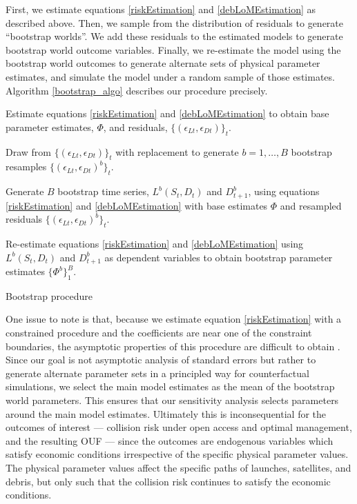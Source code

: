 \documentclass[9pt,twoside,lineno]{pnas-new}
\begin{document}
First, we estimate equations \ref{riskEstimation} and \ref{debLoMEstimation} as described above. Then, we sample from the distribution of residuals to generate ``bootstrap worlds''. We add these residuals to the estimated models to generate bootstrap world outcome variables. Finally, we re-estimate the model using the bootstrap world outcomes to generate alternate sets of physical parameter estimates, and simulate the model under a random sample of those estimates. Algorithm \ref{bootstrap_algo} describes our procedure precisely.\\
\begin{algorithm}
	Estimate equations \ref{riskEstimation} and \ref{debLoMEstimation} to obtain base parameter estimates, $\Phi$, and residuals, $\{(\epsilon_{Lt},\epsilon_{Dt})\}_t$.
	
	Draw from $\{(\epsilon_{Lt},\epsilon_{Dt})\}_t$ with replacement to generate $b=1,\dots,B$ bootstrap resamples $\{(\epsilon_{Lt},\epsilon_{Dt})^b\}_t$.
	
	Generate $B$ bootstrap time series, $L^b(S_t,D_t)$ and $D_{t+1}^b$, using equations \ref{riskEstimation} and \ref{debLoMEstimation} with base estimates $\Phi$ and resampled residuals $\{ (\epsilon_{Lt},\epsilon_{Dt})^b \}_t$.
	
	Re-estimate equations \ref{riskEstimation} and \ref{debLoMEstimation} using $L^b(S_t,D_t)$ and $D_{t+1}^b$ as dependent variables to obtain bootstrap parameter estimates $\{\Phi^b\}_1^B$.
	\caption{Bootstrap procedure}\label{bootstrap_algo}
\end{algorithm}

One issue to note is that, because we estimate equation \ref{riskEstimation} with a constrained procedure and the coefficients are near one of the constraint boundaries, the asymptotic properties of this procedure are difficult to obtain \cite{ketz2018}. Since our goal is not asymptotic analysis of standard errors but rather to generate alternate parameter sets in a principled way for counterfactual simulations, we select the main model estimates as the mean of the bootstrap world parameters. This ensures that our sensitivity analysis selects parameters around the main model estimates. Ultimately this is inconsequential for the outcomes of interest --- collision risk under open access and optimal management, and the resulting OUF --- since the outcomes are endogenous variables which satisfy economic conditions irrespective of the specific physical parameter values. The physical parameter values affect the specific paths of launches, satellites, and debris, but only such that the collision risk continues to satisfy the economic conditions.
\end{document}
